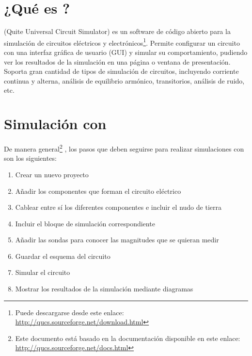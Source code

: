 \documentclass[a4paper,10pt]{article} %
\begin{document}

\vspace{1cm}

\section{¿Qué es \qucs?}

{\qucs} (Quite Universal Circuit Simulator) es un software de código abierto para la simulación de circuitos eléctricos y electrónicos\footnote{Puede descargarse desde este enlace: \url{http://qucs.sourceforge.net/download.html}}. Permite configurar un circuito con una interfaz gráfica de usuario (GUI) y simular su comportamiento, pudiendo ver los resultados de la simulación en una página o ventana de presentación. Soporta gran cantidad de tipos de simulación de circuitos, incluyendo corriente continua y alterna, análisis de equilibrio armónico, transitorios, análisis de ruido, etc. 

\section{Simulación con \qucs}
De manera general\footnote{Este documento está basado en la documentación disponible en este enlace: \url{http://qucs.sourceforge.net/docs.html}}
, los pasos que deben seguirse para realizar simulaciones con {\qucs} son los siguientes:
\begin{enumerate}
    \item Crear un nuevo proyecto
    \item Añadir los componentes que forman el circuito eléctrico
    \item Cablear entre sí los diferentes componentes e incluir el nudo de tierra
    \item Incluir el bloque de simulación correspondiente
    \item Añadir las sondas para conocer las magnitudes que se quieran medir
    \item Guardar el esquema del circuito
    \item Simular el circuito
    \item Mostrar los resultados de la simulación mediante diagramas
\end{enumerate}
\end{document}
